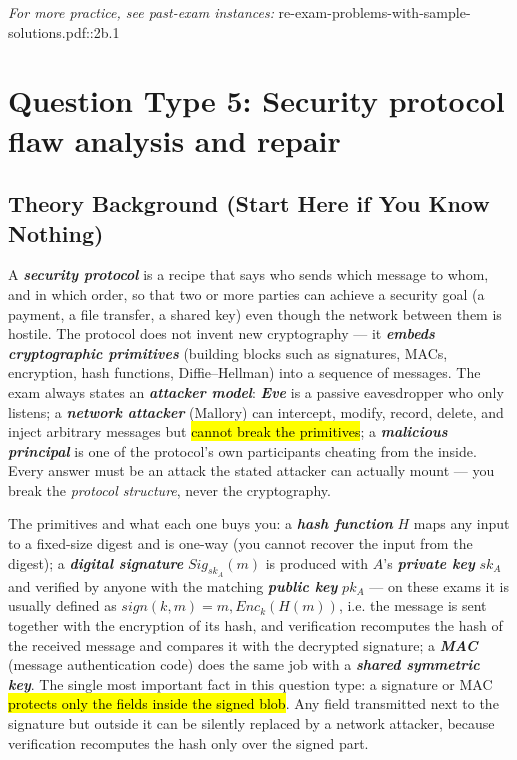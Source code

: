 \documentclass[12pt, a4paper]{article}
\newcommand{\term}[1]{\textbf{\textit{#1}}}        %
\newcommand{\imp}[1]{\hl{#1}}                       %
\begin{document}
\textit{For more practice, see past-exam instances:} re-exam-problems-with-sample-solutions.pdf::2b.1

\section{Question Type 5: Security protocol flaw analysis and repair}

\subsection*{Theory Background (Start Here if You Know Nothing)}
A \term{security protocol} is a recipe that says who sends which message to whom, and in which order, so that two or more parties can achieve a security goal (a payment, a file transfer, a shared key) even though the network between them is hostile. The protocol does not invent new cryptography --- it \term{embeds cryptographic primitives} (building blocks such as signatures, MACs, encryption, hash functions, Diffie--Hellman) into a sequence of messages. The exam always states an \term{attacker model}: \term{Eve} is a passive eavesdropper who only listens; a \term{network attacker} (Mallory) can intercept, modify, record, delete, and inject arbitrary messages but \imp{cannot break the primitives}; a \term{malicious principal} is one of the protocol's own participants cheating from the inside. Every answer must be an attack the stated attacker can actually mount --- you break the \emph{protocol structure}, never the cryptography.

The primitives and what each one buys you: a \term{hash function} $H$ maps any input to a fixed-size digest and is one-way (you cannot recover the input from the digest); a \term{digital signature} $Sig_{sk_A}(m)$ is produced with $A$'s \term{private key} $sk_A$ and verified by anyone with the matching \term{public key} $pk_A$ --- on these exams it is usually defined as $sign(k, m) = m, Enc_k(H(m))$, i.e. the message is sent together with the encryption of its hash, and verification recomputes the hash of the received message and compares it with the decrypted signature; a \term{MAC} (message authentication code) does the same job with a \term{shared symmetric key}. The single most important fact in this question type: a signature or MAC \imp{protects only the fields inside the signed blob}. Any field transmitted next to the signature but outside it can be silently replaced by a network attacker, because verification recomputes the hash only over the signed part.
\end{document}
